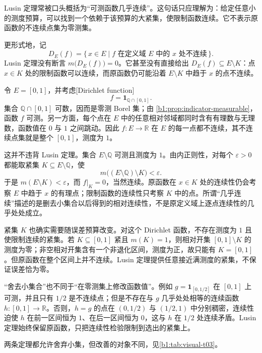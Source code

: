 Lusin 定理常被口头概括为“可测函数几乎连续”。这句话只应理解为：给定任意小的测度预算，可以找到一个依赖于该预算的大紧集，使限制函数连续。它不表示原函数的不连续点集为零测集。

\ProseParagraphBreak

更形式地，记
\[
D_E(f)
=\{\,x\in E\mid f\text{ 在定义域 }E\text{ 中的 }x\text{ 处不连续}\,\}.
\]
Lusin 定理没有断言 \(m\bigl(D_E(f)\bigr)=0\)。它甚至没有直接给出
\(D_E(f)\subseteq E\setminus K\)：点 \(x\in K\) 处的限制函数可以连续，而原函数仍可能沿着 \(E\setminus K\) 中趋于 \(x\) 的点不连续。

\ProseParagraphBreak

令 \(E=[0,1]\)，并考虑[Dirichlet function]
\[
f=\mathbf 1_{\mathbb Q\cap[0,1]}.
\]
集合 \(\mathbb Q\cap[0,1]\) 可数，因而是零测 Borel 集；由%
\cref{b1:prop:indicator-measurable}，函数 \(f\) 可测。另一方面，每个点在 \(E\) 中的任意相对邻域都同时含有有理数与无理数，函数值在 \(0\) 与 \(1\) 之间跳动。因此 \(f:E\rightarrow\mathbb R\) 在 \(E\) 的每一点都不连续，其不连续点集就是整个 \([0,1]\)，测度为 \(1\)。

\ProseParagraphBreak

这并不违背 Lusin 定理。集合 \(E\setminus\mathbb Q\) 可测且测度为
\(1\)。由内正则性，对每个 \(\varepsilon>0\) 都能取紧集
\(K\subseteq E\setminus\mathbb Q\)，使
\[
m\bigl((E\setminus\mathbb Q)\setminus K\bigr)<\varepsilon.
\]
于是 \(m(E\setminus K)<\varepsilon\)，而 \(f|_K=0\)，当然连续。原函数在 \(x\in K\) 处的连续性仍会考察 \(E\) 中趋于 \(x\) 的有理点；限制函数的连续性只考察 \(K\) 中的点。所谓“几乎连续”描述的是删去小集合以后得到的相对连续性，不是原定义域上逐点连续性的几乎处处成立。

\ProseParagraphBreak

紧集 \(K\) 也确实需要随误差预算改变。对这个 Dirichlet 函数，不存在测度为 \(1\) 且使限制连续的紧集。若
\(K\subseteq[0,1]\) 紧且 \(m(K)=1\)，则相对开集
\([0,1]\setminus K\) 的测度为零；非空相对开集含有一个非退化区间，测度为正，故只能有 \(K=[0,1]\)。但原函数在整个区间上并不连续。Lusin 定理提供任意接近满测度的紧集，不保证误差恰为零。

\ProseParagraphBreak

“舍去小集合”也不同于“在零测集上修改函数值”。例如
\(g=\mathbf 1_{[0,1/2]}\) 在 \([0,1]\) 上可测，并且只有 \(1/2\) 是不连续点；但是不存在与 \(g\) 几乎处处相等的连续函数
\(h:[0,1]\rightarrow\mathbb R\)。否则，\(h=g\) 的点在 \((0,1/2)\) 与
\((1/2,1)\) 中分别稠密，连续性迫使 \(h\) 在前一区间恒为 \(1\)、在后一区间恒为 \(0\)，这与 \(h\) 在 \(1/2\) 处连续矛盾。Lusin 定理始终保留原函数，只把连续性检验限制到选出的紧集上。

两条定理都允许舍弃小集，但改善的对象不同，见\cref{b1:tab:visual-t03}。

